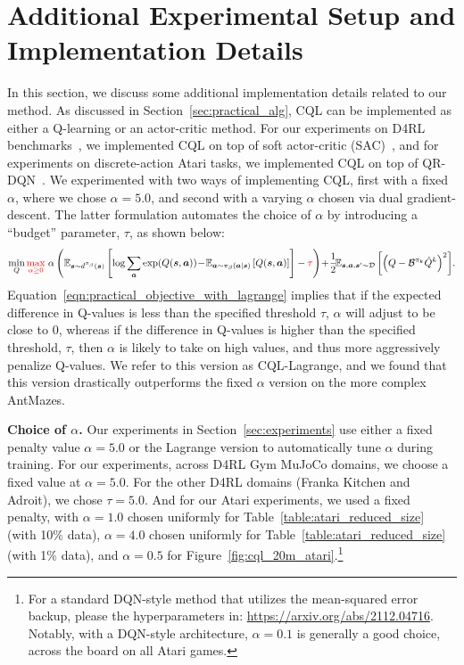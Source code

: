 \section{Additional Experimental Setup and Implementation Details}
\label{sec:experimental_details}
In this section, we discuss some additional implementation details related to our method. As discussed in Section~\ref{sec:practical_alg}, CQL can be implemented as either a Q-learning or an actor-critic method. For our experiments on D4RL benchmarks~\citep{d4rl}, we implemented CQL on top of soft actor-critic (SAC)~\citep{haarnoja}, and for experiments on discrete-action Atari tasks, we implemented CQL on top of QR-DQN~\citep{dabney2018distributional}.
We experimented with two ways of implementing CQL, first with a fixed $\alpha$, where we chose $\alpha=5.0$, and second with a varying $\alpha$ chosen via dual gradient-descent. The latter formulation automates the choice of $\alpha$ by introducing a ``budget'' parameter, $\tau$, as shown below:
\begin{equation}
    \small{\min_{Q} \textcolor{red}{\max_{\alpha \geq 0}}~ \alpha \left( \mathbb{E}_{\boldsymbol{s}\sim d^{\pi_\beta}(\boldsymbol{s})}\left[\log \sum_{\boldsymbol{a}} \exp(Q(\boldsymbol{s}, \boldsymbol{a}))\!-\!\mathbb{E}_{\boldsymbol{a}\sim {\pi_\beta}(\boldsymbol{a}|\boldsymbol{s})}\left[Q(\boldsymbol{s}, \boldsymbol{a})\right]\right] - \textcolor{red}{\tau}\right) \!+\!\frac{1}{2}\!\mathbb{E}_{\boldsymbol{s}, \boldsymbol{a}, \boldsymbol{s}' \sim \mathcal{D}}\left[\left(Q - \mathcal{B}^{\pi_k} \hat{Q}^{k} \right)^2 \right]\!.}
    \label{eqn:practical_objective_with_lagrange}
\end{equation}
Equation~\ref{eqn:practical_objective_with_lagrange} implies that if the expected difference in Q-values is less than the specified threshold $\tau$, $\alpha$ will adjust to be close to $0$, whereas if the difference in Q-values is higher than the specified threshold, $\tau$, then $\alpha$ is likely to take on high values, and thus more aggressively penalize Q-values. We refer to this version as CQL-Lagrange, and we found that this version drastically outperforms the fixed $\alpha$ version on the more complex AntMazes. 

\textbf{Choice of $\alpha$.} Our experiments in Section~\ref{sec:experiments} use either a fixed penalty value $\alpha = 5.0$ or the Lagrange version to automatically tune $\alpha$ during training. 
For our experiments, across D4RL Gym MuJoCo domains, we choose a fixed value at $\alpha = 5.0$. For the other D4RL domains (Franka Kitchen and Adroit), we chose $\tau = 5.0$. And for our Atari experiments, we used a fixed penalty, with $\alpha=1.0$ chosen uniformly for Table~\ref{table:atari_reduced_size} (with 10\% data), $\alpha=4.0$ chosen uniformly for Table~\ref{table:atari_reduced_size} (with 1\% data), and $\alpha=0.5$ for Figure~\ref{fig:cql_20m_atari}.\footnote{For a standard DQN-style method that utilizes the mean-squared error backup, please the hyperparameters in: \url{https://arxiv.org/abs/2112.04716}. Notably, with a DQN-style architecture, $\alpha=0.1$ is generally a good choice, across the board on all Atari games.}

